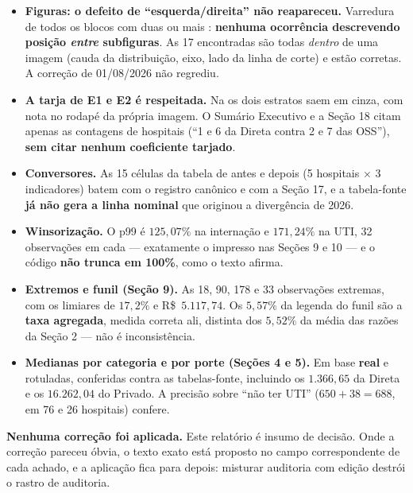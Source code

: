 \documentclass[12pt,a4paper]{article}
\newcommand{\arq}[1]{\texttt{\detokenize{#1}}}
\begin{document}
\begin{itemize}[leftmargin=*]
\item \textbf{Figuras: o defeito de ``esquerda/direita'' não
  reapareceu.} Varredura de todos os blocos com duas ou mais
  \arq{\subfig}: \textbf{nenhuma ocorrência descrevendo posição
  \emph{entre} subfiguras}. As 17 encontradas são todas \emph{dentro} de
  uma imagem (cauda da distribuição, eixo, lado da linha de corte) e
  estão corretas. A correção de 01/08/2026 não regrediu.

\item \textbf{A tarja de E1 e E2 é respeitada.} Na \arq{figSEG_04} os
  dois estratos saem em cinza, com nota no rodapé da própria imagem. O
  Sumário Executivo e a Seção 18 citam apenas as contagens de hospitais
  (``1 e 6 da Direta contra 2 e 7 das OSS''), \textbf{sem citar nenhum
  coeficiente tarjado}.

\item \textbf{Conversores.} As 15 células da tabela de antes e depois
  (5 hospitais $\times$ 3 indicadores) batem com o registro canônico e
  com a Seção 17, e a tabela-fonte \textbf{já não gera a linha
  nominal} que originou a divergência de 2026.

\item \textbf{Winsorização.} O p99 é $125{,}07\%$ na internação e
  $171{,}24\%$ na UTI, 32 observações em cada --- exatamente o impresso
  nas Seções 9 e 10 --- e o código \textbf{não trunca em 100\%}, como o
  texto afirma.

\item \textbf{Extremos e funil (Seção 9).} As 18, 90, 178 e 33
  observações extremas, com os limiares de $17{,}2\%$ e R\$~$5.117{,}74$.
  Os $5{,}57\%$ da legenda do funil são a \textbf{taxa agregada}, medida
  correta ali, distinta dos $5{,}52\%$ da média das razões da Seção 2 ---
  não é inconsistência.

\item \textbf{Medianas por categoria e por porte (Seções 4 e 5).} Em
  base \textbf{real} e rotuladas, conferidas contra as tabelas-fonte,
  incluindo os $1.366{,}65$ da Direta e os $16.262{,}04$ do Privado. A
  precisão sobre ``não ter UTI'' ($650 + 38 = 688$, em 76 e 26
  hospitais) confere.
\end{itemize}

\vspace{1em}
\noindent\textbf{Nenhuma correção foi aplicada.} Este relatório é insumo
de decisão. Onde a correção pareceu óbvia, o texto exato está proposto no
campo correspondente de cada achado, e a aplicação fica para depois:
misturar auditoria com edição destrói o rastro de auditoria.
\end{document}
